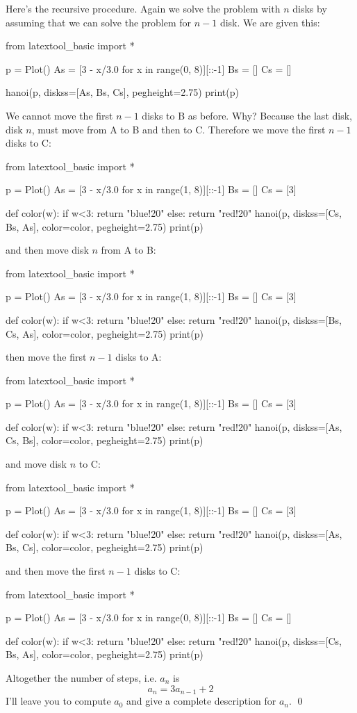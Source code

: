 Here's the recursive procedure.
Again we solve the problem with $n$ disks by 
assuming that we can solve the problem for $n-1$ disk.
We are given this:
\begin{python}
from latextool_basic import *

p = Plot()
As = [3 - x/3.0 for x in range(0, 8)][::-1]
Bs = []
Cs = []
    
hanoi(p, diskss=[As, Bs, Cs], pegheight=2.75)
print(p)
\end{python}
We cannot move the first $n-1$ disks to B as before.
Why? Because the last disk, disk $n$, must move from A to B and then to C.
Therefore we move the first $n-1$ disks to C:
\begin{python}
from latextool_basic import *

p = Plot()
As = [3 - x/3.0 for x in range(1, 8)][::-1]
Bs = []
Cs = [3]

def color(w):
    if w<3: return "blue!20"
    else: return "red!20"
hanoi(p, diskss=[Cs, Bs, As], color=color, pegheight=2.75)
print(p)
\end{python}
and then move disk $n$ from A to B:
\begin{python}
from latextool_basic import *

p = Plot()
As = [3 - x/3.0 for x in range(1, 8)][::-1]
Bs = []
Cs = [3]

def color(w):
    if w<3: return "blue!20"
    else: return "red!20"
hanoi(p, diskss=[Bs, Cs, As], color=color, pegheight=2.75)
print(p)
\end{python}
then move the first $n-1$ disks to A:
\begin{python}
from latextool_basic import *

p = Plot()
As = [3 - x/3.0 for x in range(1, 8)][::-1]
Bs = []
Cs = [3]

def color(w):
    if w<3: return "blue!20"
    else: return "red!20"
hanoi(p, diskss=[As, Cs, Bs], color=color, pegheight=2.75)
print(p)
\end{python}
and move disk $n$ to C:
\begin{python}
from latextool_basic import *

p = Plot()
As = [3 - x/3.0 for x in range(1, 8)][::-1]
Bs = []
Cs = [3]

def color(w):
    if w<3: return "blue!20"
    else: return "red!20"
hanoi(p, diskss=[As, Bs, Cs], color=color, pegheight=2.75)
print(p)
\end{python}
and then move the first $n-1$ disks to C:
\begin{python}
from latextool_basic import *

p = Plot()
As = [3 - x/3.0 for x in range(0, 8)][::-1]
Bs = []
Cs = []

def color(w):
    if w<3: return "blue!20"
    else: return "red!20"
hanoi(p, diskss=[Cs, Bs, As], color=color, pegheight=2.75)
print(p)
\end{python}
Altogether the number of steps, i.e. $a_n$ is
\[
a_n = 3a_{n-1} + 2
\]
I'll leave you to compute $a_0$ and give a complete description
for $a_n$.
\qed

